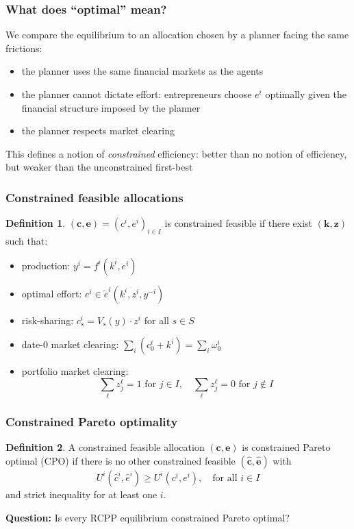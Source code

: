 \documentclass[blue]{beamer}
\def\geq{\geqslant}
\theoremstyle{definition}
\theoremstyle{example}
\newtheorem*{definitionns}{Definition}
\begin{document}
\begin{frame}\frametitle{What does ``optimal'' mean?}
We compare the equilibrium to an allocation chosen by a planner facing the same frictions:
\bigskip

\begin{itemize}
\item the planner uses the same financial markets as the agents
\item the planner cannot dictate effort: entrepreneurs choose $e^i$ optimally given the financial structure imposed by the planner
\item the planner respects market clearing
\end{itemize}
\bigskip

This defines a notion of \emph{constrained} efficiency: better than no notion of efficiency, but weaker than the unconstrained first-best
\end{frame}

\begin{frame}\frametitle{Constrained feasible allocations}
\begin{definitionns}
$(\bm{c}, \bm{e}) = (c^i, e^i)_{i \in I}$ is \alert{constrained feasible} if there exist $(\bm{k}, \bm{z})$ such that:
\end{definitionns}

\begin{itemize}
\item[(i)] production: $y^i = f^i(k^i, e^i)$
\item[(ii)] optimal effort: $e^i \in \widetilde{e}^i(k^i, z^i, y^{-i})$
\item[(iii)] risk-sharing: $c^i_s = V_s(y) \cdot z^i$ for all $s \in S$
\item[(iv)] date-$0$ market clearing: $\sum_i (c^i_0 + k^i) = \sum_i \omega^i_0$
\item[(v)] portfolio market clearing:
\begin{equation*}
\sum_\ell z^\ell_j = 1 \text{ for $j \in I$}, \quad \sum_\ell z^\ell_j = 0 \text{ for $j \notin I$}
\end{equation*}
\end{itemize}
\end{frame}

\begin{frame}\frametitle{Constrained Pareto optimality}
\begin{definitionns}
A constrained feasible allocation $(\bm{c}, \bm{e})$ is \alert{constrained Pareto optimal} (CPO) if there is no other constrained feasible $(\widehat{\bm{c}}, \widehat{\bm{e}})$ with
\begin{equation*}
U^i(\widehat{c}^i, \widehat{e}^i) \geq U^i(c^i, e^i), \quad \text{for all $i \in I$}
\end{equation*}
and strict inequality for at least one $i$.
\end{definitionns}
\bigskip

\textbf{Question:} Is every RCPP equilibrium constrained Pareto optimal?
\end{frame}
\end{document}
